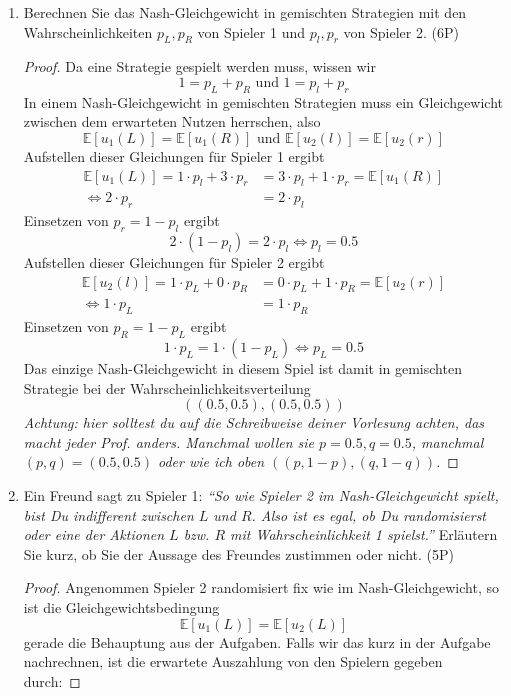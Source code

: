 \documentclass[12pt]{article}
\begin{document}
\begin{enumerate}[label=\alph*\upshape)]
\begin{proof}
			Das heißt hier gibt es kein Nash-Gleichgewicht in reinen Strategien.
		\end{proof}
	\item Berechnen Sie das Nash-Gleichgewicht in gemischten Strategien mit den Wahrscheinlichkeiten $p_L, p_R$ von Spieler 1 und $p_l, p_r$ von Spieler 2. (6P)
		\begin{proof}
			Da eine Strategie gespielt werden muss, wissen wir
			$$ 1 = p_L + p_R \text{ und } 1 = p_l + p_r $$
			In einem Nash-Gleichgewicht in gemischten Strategien muss ein Gleichgewicht zwischen dem erwarteten Nutzen herrschen, also
			$$ \mathbb{E}[u_1(L)] = \mathbb{E}[u_1(R)] \text{ und } \mathbb{E}[u_2(l)] = \mathbb{E}[u_2(r)] $$ 
			Aufstellen dieser Gleichungen für Spieler 1 ergibt
			\begin{align*}
				\mathbb{E}[u_1(L)]  = 1 \cdot p_l + 3 \cdot p_r & = 3 \cdot p_l + 1 \cdot p_r = \mathbb{E}[u_1(R)] \\
				\iff 2 \cdot p_r & = 2 \cdot p_l
			\end{align*}
			Einsetzen von $p_r = 1 - p_l$ ergibt
			$$ 2 \cdot (1 - p_l) = 2 \cdot p_l \iff p_l = 0.5 $$
			Aufstellen dieser Gleichungen für Spieler 2 ergibt
			\begin{align*}
				\mathbb{E}[u_2(l)]  = 1 \cdot p_L + 0 \cdot p_R & = 0 \cdot p_L + 1 \cdot p_R = \mathbb{E}[u_2(r)] \\
				\iff 1 \cdot p_L & = 1 \cdot p_R
			\end{align*}
			Einsetzen von $p_R = 1 - p_L$ ergibt
			$$ 1 \cdot p_L = 1 \cdot (1 - p_L) \iff p_L = 0.5 $$
			Das einzige Nash-Gleichgewicht in diesem Spiel ist damit in gemischten Strategie bei der Wahrscheinlichkeitsverteilung 
			$$ \left( (0.5, 0.5), (0.5, 0.5) \right) $$
			\textit{Achtung: hier solltest du auf die Schreibweise deiner Vorlesung achten, das macht jeder Prof. anders. Manchmal wollen sie $p = 0.5, q= 0.5$, manchmal $(p, q) = (0.5,0.5)$ oder wie ich oben $( (p, 1-p), (q, 1-q) )$.}
		\end{proof}
	\item Ein Freund sagt zu Spieler 1: \textit{\enquote{So wie Spieler 2 im Nash-Gleichgewicht spielt, bist Du indifferent zwischen $L$ und $R$. Also ist es egal, ob Du randomisierst oder eine der Aktionen $L$ bzw. $R$ mit Wahrscheinlichkeit 1 spielst.}} Erläutern Sie kurz, ob Sie der Aussage des Freundes zustimmen oder nicht. (5P)
		\begin{proof}
			Angenommen Spieler 2 randomisiert fix wie im Nash-Gleichgewicht, so ist die Gleichgewichtsbedingung
			$$ \mathbb{E}[u_1(L)] = \mathbb{E}[u_2(L)] $$
			gerade die Behauptung aus der Aufgaben. Falls wir das kurz in der Aufgabe nachrechnen, ist die erwartete Auszahlung von den Spielern gegeben durch: 
						

\end{proof}
\end{enumerate}
\end{document}
